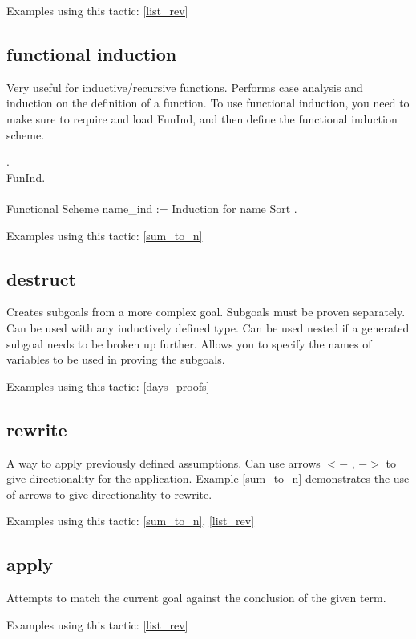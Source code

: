 \noindent
Examples using this tactic: 
\ref{list_rev}


\subsection{functional induction} \label{functional induction}
Very useful for inductive/recursive functions.
Performs case analysis and induction on the definition of a function.
To use functional induction, you need to make sure to require and load FunInd, and then define the functional induction scheme.

\begin{code}
 .	\\
\Load FunInd.
\\ \\
Functional Scheme name\_ind := 
  Induction for name Sort .
\end{code}

\noindent
Examples using this tactic: 
\ref{sum_to_n}


\subsection{destruct} \label{destruct}
Creates subgoals from a more complex goal. 
Subgoals must be proven separately.
Can be used with any inductively defined type.
Can be used nested if a generated subgoal needs to be broken up further.
Allows you to specify the names of variables to be used in proving the subgoals.

\noindent
Examples using this tactic: 
\ref{days_proofs}


\subsection{rewrite} \label{rewrite}
A way to apply previously defined assumptions.
Can use arrows $<-$ , $->$ to give directionality for the application.
Example \ref{sum_to_n} demonstrates the use of arrows to give directionality to rewrite.

\noindent
Examples using this tactic: 
\ref{sum_to_n}, \ref{list_rev}


\subsection{apply} \label{apply}
Attempts to match the current goal against the conclusion of the given term.

\noindent
Examples using this tactic:
\ref{list_rev}






